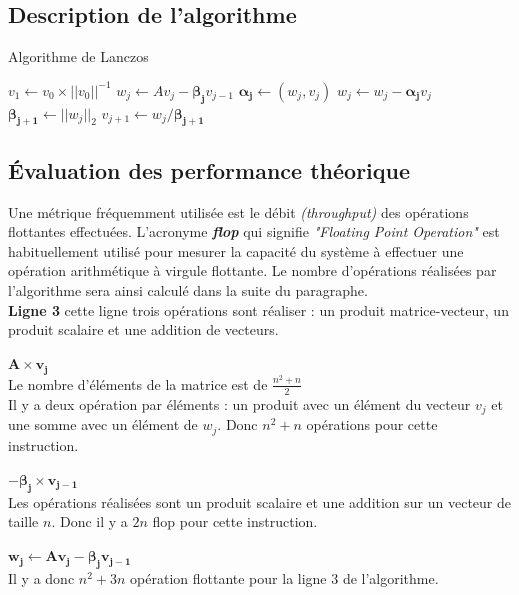 \documentclass[11pt,french]{article}
\begin{document}
	\subsection{Description de l'algorithme}
	\begin{algorithm}
		\caption{Algorithme de Lanczos}\label{alg:lanczos}
		\begin{algorithmic}[1]
			\State $v_1 \gets v_0 \times|| v_0||^{-1} $
				\State $w_j \gets Av_j - \boldsymbol{\beta_j }v_{j-1}$
				\State $\boldsymbol{\alpha_j} \gets (w_j,v_j)$
				\State $w_j \gets w_j - \boldsymbol{\alpha_j} v_j$
				\State $\boldsymbol{\beta_{j+1}} \gets || w_j||_2$
				\State $ v_{j+1} \gets w_j /\boldsymbol{\beta_{j+1}} $
			\EndFor
			\State \Return 
		\end{algorithmic}
	\end{algorithm}
	
	\subsection{Évaluation des performance théorique}
	Une métrique fréquemment utilisée est le débit \emph{(throughput)} des opérations flottantes effectuées. L’acronyme \textbf{\emph{flop}} qui signifie \emph{"Floating Point Operation"} est habituellement utilisé pour mesurer la capacité du système à effectuer une opération arithmétique à virgule flottante. Le nombre d'opérations réalisées par l'algorithme sera ainsi calculé dans la suite du paragraphe.  \\

	\noindent \textbf{Ligne  3}
	cette ligne trois opérations sont réaliser : un produit matrice-vecteur, un produit scalaire et une addition de vecteurs. \\ \\
	$\boldsymbol{ A \times v_j}$\\
	Le nombre d’éléments de la matrice est de $\frac{n^2 + n}{2}$ \\
	Il y a deux opération par éléments :  un produit avec un élément du vecteur  $v_j$ et une somme avec un élément de $w_j$.
	Donc $n^2 + n$ opérations pour cette instruction. \\ \\
	$\boldsymbol{ - \beta_j \times v_{j - 1}}$\\
	Les opérations réalisées sont un produit scalaire et une addition sur un vecteur de taille $n$.
	Donc il y a $2n$ flop pour cette instruction. \\  \\
	\noindent $\boldsymbol{w_j \gets Av_j - \beta_j  v_{j-1}}$ \\
	Il y a donc $n^2 + 3n$ opération flottante pour la ligne 3 de l'algorithme.  \\
	
\end{document}

